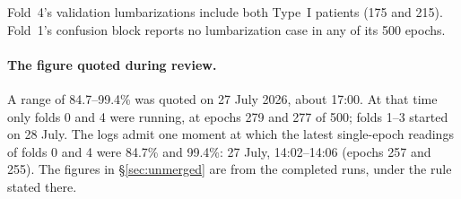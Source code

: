 Fold~4's validation lumbarizations include both Type~I
patients (175 and 215). Fold~1's confusion block reports no
lumbarization case in any of its 500 epochs.

\paragraph{The figure quoted during review.}
A range of 84.7--99.4\% was quoted on 27 July 2026, about
17:00. At that time only folds 0 and 4 were running, at
epochs 279 and 277 of 500; folds 1--3 started on 28 July.
The logs admit one moment at which the latest single-epoch
readings of folds 0 and 4 were 84.7\% and 99.4\%: 27 July,
14:02--14:06 (epochs 257 and 255). The figures in
\S\ref{sec:unmerged} are from the completed runs, under
the rule stated there.
